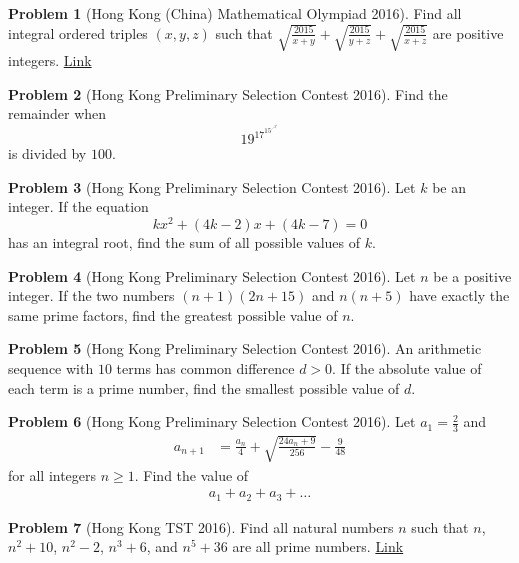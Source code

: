 \documentclass[]{article}
\theoremstyle{definition}
\newtheorem{problem}{Problem}
\begin{document}
\begin{problem}[Hong Kong (China) Mathematical Olympiad 2016]
	Find all integral ordered triples $(x,y,z)$ such that $\displaystyle\sqrt{\frac{2015}{x+y}}+\sqrt{\frac{2015}{y+z}}+\sqrt{\frac{2015}{x+z}}$ are positive integers. \hfill \href{http://www.artofproblemsolving.com/community/c6h37234p233034}{Link}
\end{problem}




\begin{problem}[Hong Kong Preliminary Selection Contest 2016]
	Find the remainder when $$19^{17^{15^{\iddots^{3^{1}}}}}$$ is divided by $100$.
\end{problem}


\begin{problem}[Hong Kong Preliminary Selection Contest 2016]
	Let $k$ be an integer. If the equation $$kx^2 + (4k - 2)x + (4k - 7) = 0$$ has an integral root, find the sum of all possible values of $k$.
\end{problem}


\begin{problem}[Hong Kong Preliminary Selection Contest 2016]
	Let $n$ be a positive integer. If the two numbers $(n + 1)(2n + 15)$ and $n(n + 5)$ have exactly the same prime factors, find the greatest possible value of $n$.
\end{problem}



\begin{problem}[Hong Kong Preliminary Selection Contest 2016]
	An arithmetic sequence with $10$ terms has common difference $d > 0$. If the absolute value of each term is a prime number, find the smallest possible value of $d$.
\end{problem}





\begin{problem}[Hong Kong Preliminary Selection Contest 2016]
	Let $a_1 = \frac{2}{3}$ and
		\begin{align*}
			a_{n+1} &= \frac{a_n}{4} + \sqrt{\frac{24a_n+9}{256}} - \frac{9}{48}
		\end{align*}
	for all integers $n \geq 1$. Find the value of
		\begin{align*}
			a_1+a_2+a_3+\dots
		\end{align*}
\end{problem}


\begin{problem}[Hong Kong TST 2016]
	Find all natural numbers $n$ such that $n$, $n^2+10$, $n^2-2$, $n^3+6$, and $n^5+36$ are all prime numbers. \hfill \href{http://artofproblemsolving.com/community/c6h1155577p5481499}{Link}
\end{problem}
\end{document}
